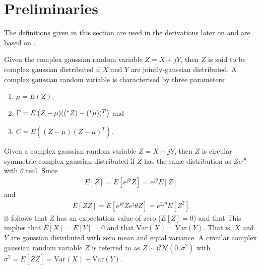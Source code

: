\documentclass[a4paper, openany, oneside]{memoir}
\begin{document}
\section{Preliminaries}
The definitions given in this section are used in the derivations later on and are based  on \cite{yates2005probability}.

\begin{blockDefinition}
Given the complex gaussian random variable $Z = X + jY$, then $Z$ is said to be complex gaussian distributed if $X$ and $Y$ are jointly-gaussian distributed. A complex gaussian random variable is characterised by three parameters:
\begin{enumerate}
	\item $\mu = E(Z)$,
	\item $\Gamma = E\left(Z-\mu)((^*Z)-(^*\mu))^T\right)$ and
	\item $C = E\left((Z-\mu)(Z-\mu)^T\right)$.
\end{enumerate}
\end{blockDefinition}

\begin{blockDefinition}
Given a complex gaussian random variable $Z = X + jY$, then $Z$ is circular symmetric complex gaussian distributed if $Z$ has the same distribution as $Ze^{j\theta}$ with $\theta$ real. Since
\begin{align*}
	E\left[Z\right] = E\left[e^{j\theta}Z\right]  = e^{j\theta}E\left[Z\right] 
\end{align*}
and
\begin{align*}
	E\left[ZZ\right] = E\left[e^{j\theta}Z e^j\theta{Z}\right]  = e^{2j\theta}E\left[Z^2\right] 
\end{align*}
it follows that $Z$  has an expectation value of zero ($E\left[Z\right] = 0$) and that %
This implies that $E\left[X\right] = E\left[Y\right] = 0$ and that $\text{Var}\left(X\right) = \text{Var}\left(Y\right)$. That is, $X$ and $Y$ are gaussian distributed
with zero mean and equal variance. 
A circular complex gaussian random variable $Z$ is referred to as $Z \sim \mathcal{CN}(0,\sigma^2)$ with $\sigma^2= E\left[Z\overline{Z}\right] = \text{Var}\left(X\right) + \text{Var}\left(Y\right)$. 
\end{blockDefinition}
\end{document}
